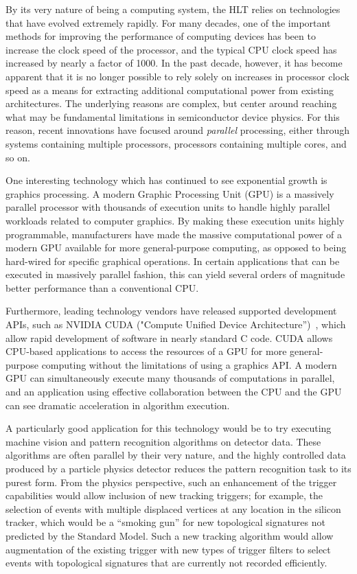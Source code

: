 \documentclass{JINST}
\begin{document}
By its very nature of being a computing system, the HLT relies on technologies that have evolved
extremely rapidly.  For many decades, one of the important methods for improving the performance of computing devices
has been to increase the clock speed of the processor, and the typical CPU clock speed has increased by nearly a factor of 1000.
In the past decade, however, it has become apparent that it is no longer possible to rely solely on increases
in processor clock speed as a means for extracting additional computational power from existing architectures.
The underlying reasons are complex, but center around reaching what may be fundamental limitations in
semiconductor device physics.  For this reason, recent innovations have focused around {\em parallel}
processing, either through systems containing multiple processors, processors containing multiple cores, and so on.

One interesting technology which has continued to see exponential growth is graphics processing.  
A modern Graphic Processing Unit (GPU) is a massively parallel processor with thousands of execution units to handle highly parallel workloads
related to computer graphics.  By making these execution units highly programmable, manufacturers have made
the massive computational power of a modern GPU available for more general-purpose computing,
as opposed to being hard-wired for specific graphical operations.  In certain applications that can be executed in massively parallel
 fashion, this can yield several orders of magnitude better performance than a conventional CPU.

Furthermore, leading technology vendors have released supported development APIs, such as NVIDIA
CUDA ("Compute Unified Device Architecture'')~\cite{bib:CUDA}, which allow rapid development of
software in nearly standard C code. CUDA allows CPU-based applications to access the resources of a GPU 
for more general-purpose computing without the limitations of using a graphics API.
 A modern GPU can simultaneously execute many thousands of computations in parallel, and an application using 
effective collaboration between the CPU and the GPU can see dramatic acceleration in algorithm execution.

A particularly good application for this technology would be to try executing machine vision
and pattern recognition algorithms on detector data. These algorithms are often parallel
by their very nature, and the highly controlled data produced by a particle physics detector
reduces the pattern recognition task to its purest form.  From the physics perspective,
such an enhancement of the trigger capabilities would allow inclusion of new tracking triggers;
for example, the selection of events with multiple displaced vertices at any location in the silicon 
tracker, which would be a ``smoking gun'' for new topological
signatures not predicted by the Standard Model. Such a new tracking algorithm would allow
augmentation of the existing trigger with new types of trigger filters to select events with topological signatures
that are currently not recorded efficiently. 
\end{document}
